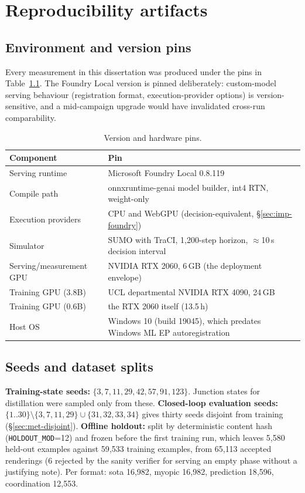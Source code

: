 \chapter{Reproducibility artifacts}\label{app:repro}

\section{Environment and version pins}
Every measurement in this dissertation was produced under the pins in
Table~\ref{tab:pins}. The Foundry Local version is pinned deliberately:
custom-model serving behaviour (registration format, execution-provider
options) is version-sensitive, and a mid-campaign upgrade would have
invalidated cross-run comparability.

\begin{table}[h]
\caption{Version and hardware pins.}
\label{tab:pins}
\centering
\small
\begin{tabular}{ll}
\toprule
Component & Pin \\
\midrule
Serving runtime & Microsoft Foundry Local 0.8.119 \\
Compile path & onnxruntime-genai model builder, int4 RTN, weight-only \\
Execution providers & CPU and WebGPU (decision-equivalent, \S\ref{sec:imp-foundry}) \\
Simulator & SUMO with TraCI, 1{,}200-step horizon, $\approx$10\,s decision interval \\
Serving/measurement GPU & NVIDIA RTX 2060, 6\,GB (the deployment envelope) \\
Training GPU (3.8B) & UCL departmental NVIDIA RTX 4090, 24\,GB \\
Training GPU (0.6B) & the RTX 2060 itself (13.5\,h) \\
Host OS & Windows 10 (build 19045), which predates Windows ML EP autoregistration \\
\bottomrule
\end{tabular}
\end{table}

\section{Seeds and dataset splits}
\textbf{Training-state seeds:} $\{3, 7, 11, 29, 42, 57, 91, 123\}$. Junction states for
distillation were sampled only from these.
\textbf{Closed-loop evaluation seeds:}
$\{1..30\}\setminus\{3,7,11,29\}\cup\{31,32,33,34\}$ gives thirty seeds
disjoint from training (\S\ref{sec:met-disjoint}).
\textbf{Offline holdout:} split by deterministic content hash
(\texttt{HOLDOUT\_MOD}=12) and frozen before the first training run, which
leaves 5{,}580 held-out examples against 59{,}533 training examples, from
65{,}113 accepted renderings (6 rejected by the sanity verifier for serving an
empty phase without a justifying note). Per format: sota 16{,}982, myopic
16{,}982, prediction 18{,}596, coordination 12{,}553.

